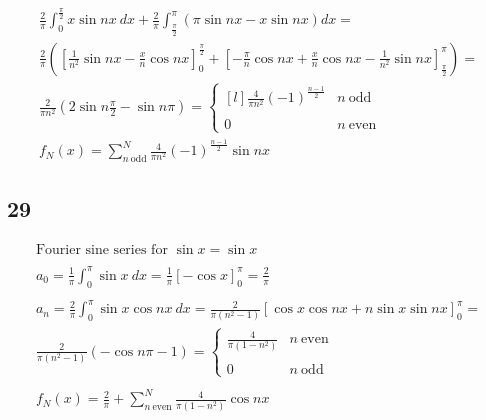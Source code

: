 \begin{gather*}
	\\
	\frac{2}{\pi} \int_0^{\frac{\pi}{2}}{x \sin{n x}\ dx} +
	\frac{2}{\pi} \int_{\frac{\pi}{2}}^\pi{\left(
		\pi \sin{n x} -
		x \sin{n x}
	\right) dx} =
	\\
	\frac{2}{\pi}
	\left(
		\left[
			\frac{1}{n^2} \sin{n x} - \frac{x}{n} \cos{n x}
		\right]_0^{\frac{\pi}{2}}
		+
		\left[
			-\frac{\pi}{n} \cos{n x} +
			\frac{x}{n} \cos{n x}
			-
			\frac{1}{n^2} \sin{n x}
		\right]_\frac{\pi}{2}^\pi
	\right) =
	\\
	\frac{2}{\pi n^2}
	\left(
		2 \sin{n \frac{\pi}{2}} -
		\sin{n \pi}
	\right) =
	\left\{
		\begin{matrix*}[l]
			\frac{4}{\pi n^2} (-1)^{\frac{n - 1}{2}}	& n\ \text{odd} \\ \\
			0											& n\ \text{even}
		\end{matrix*}
	\right.
	\\
	f_N(x) = \sum_{n\ \text{odd}}^N{
		\frac{4}{\pi n^2} (-1)^{\frac{n - 1}{2}} \sin{n x}
	}
\end{gather*}


\bigskip



\newpage


\subsection*{29}


\begin{gather*}
	\text{Fourier sine series for } \sin{x} = \sin{x}
	\\
	\\
	a_0 = \frac{1}{\pi} \int_0^\pi{\sin{x}\ dx} =
	\frac{1}{\pi} \left[
		-\cos{x}
	\right]_0^\pi =
	\frac{2}{\pi}
	\\
	\\
	a_n = \frac{2}{\pi} \int_0^\pi{
		\sin{x} \cos{n x}\ dx
	} =
	\frac{2}{\pi \left(n^2 - 1\right)}
	\left[
		\cos{x} \cos{n x} + n \sin{x} \sin{n x}
	\right]_0^\pi =
	\\
	\frac{2}{\pi \left(n^2 - 1\right)}
	\left(
		-\cos{n \pi} - 1
	\right) =
	\left\{
		\begin{matrix*}
			\frac{4}{\pi \left(1 - n^2\right)}	& n\ \text{even} \\ \\
			0									& n\ \text{odd}
		\end{matrix*}
	\right.
	\\
	\\
	f_N(x) = \frac{2}{\pi} + \sum_{n\ \text{even}}^N{\frac{4}{\pi \left(1 - n^2\right)} \cos{n x}}
\end{gather*}

\bigskip

\bigskip
\\

